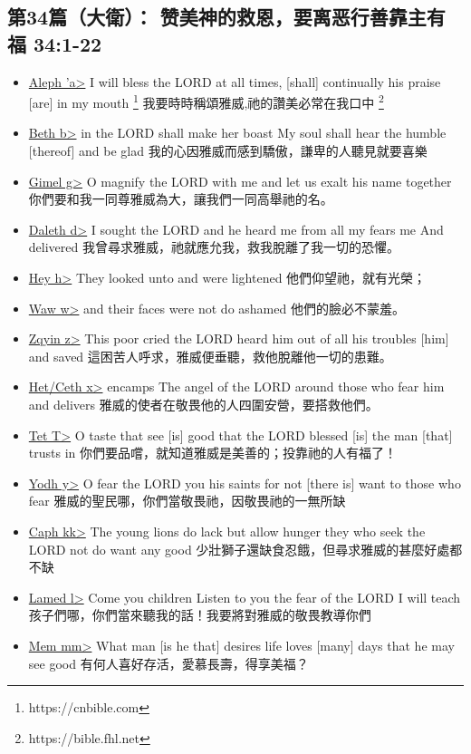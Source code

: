 \subsection{第34篇（大衛）： 赞美神的救恩，要离恶行善靠主有福 34:1-22}
\begin{itemize}
\itemsep-.45em  
\item \underline{Aleph \<'a>} I will bless the LORD at all times, [shall] continually his praise [are] in my mouth \footnote{https://cnbible.com} 我要時時稱頌雅威,祂的讚美必常在我口中 \footnote{https://bible.fhl.net}
\item \underline{Beth \<b>} in the LORD shall make her boast My soul shall hear the humble [thereof] and be glad 我的心因雅威而感到驕傲，謙卑的人聽見就要喜樂
\item \underline{Gimel \<g>} O magnify the LORD with me and let us exalt his name together 你們要和我一同尊雅威為大，讓我們一同高舉祂的名。 
\item \underline{Daleth \<d>} I sought the LORD and he heard me from all my fears me And delivered 我曾尋求雅威，祂就應允我，救我脫離了我一切的恐懼。 
\item \underline{Hey \<h>} They looked unto and were lightened 他們仰望祂，就有光榮； 
\item \underline{Waw \<w>} and their faces were not do ashamed 他們的臉必不蒙羞。 
\item \underline{Zqyin  \<z>} This poor cried the LORD heard him out of all his troubles [him] and saved 這困苦人呼求，雅威便垂聽，救他脫離他一切的患難。
\item \underline{Het/Ceth  \<x>} encamps The angel of the LORD around those who fear him and delivers 雅威的使者在敬畏他的人四圍安營，要搭救他們。 
\item \underline{Tet  \<T>} O taste that see [is] good that the LORD blessed [is] the man [that] trusts in 你們要品嚐，就知道雅威是美善的；投靠祂的人有福了！
\item \underline{Yodh \<y>} O fear the LORD you his saints for not [there is] want to those who fear 雅威的聖民哪，你們當敬畏祂，因敬畏祂的一無所缺
\item \underline{Caph \<kk>} The young lions do lack but allow hunger they who seek the LORD not do want any good 少壯獅子還缺食忍餓，但尋求雅威的甚麼好處都不缺
\item \underline{Lamed \<l>} Come you children Listen to you the fear of the LORD I will teach 孩子們哪，你們當來聽我的話！我要將對雅威的敬畏教導你們 
\item \underline{Mem \<mm>} What man [is he that] desires life loves [many] days that he may see good 有何人喜好存活，愛慕長壽，得享美福？ 

\end{itemize}
